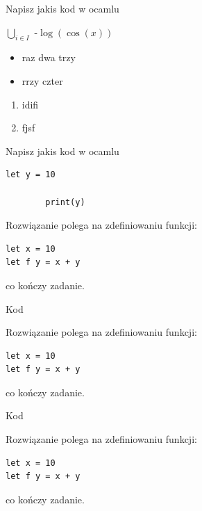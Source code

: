 \begin{asg}[Zadanie 1.]
Napisz jakis kod w ocamlu

	$\bigcup_{i \in  I} $
-$ \log{\left(\cos{\left(x \right)} \right)}$	



\begin{itemize}
	\item raz dwa trzy
	\item rrzy czter	
\end{itemize}

\begin{enumerate}
	\item idifi
	\item fjsf
\end{enumerate}

\end{asg}

\begin{problem}[Zadanie 2.]
Napisz jakis kod w ocamlu
    \begin{lstlisting}[style=ocamlStyle]
        let y = 10
        
        print(y)
    \end{lstlisting}
\end{problem}

\begin{solution}
Rozwiązanie polega na zdefiniowaniu funkcji:
\begin{lstlisting}[style=ocamlStyle]
let x = 10
let f y = x + y
\end{lstlisting}
co kończy zadanie.
\end{solution}


\begin{definition}
    Kod

Rozwiązanie polega na zdefiniowaniu funkcji:
\begin{lstlisting}[style=ocamlStyle]
let x = 10
let f y = x + y
\end{lstlisting}
co kończy zadanie.
    
\end{definition}


\begin{remark}
    Kod

Rozwiązanie polega na zdefiniowaniu funkcji:
\begin{lstlisting}[style=ocamlStyle]
let x = 10
let f y = x + y
\end{lstlisting}
co kończy zadanie.
    
\end{remark}

